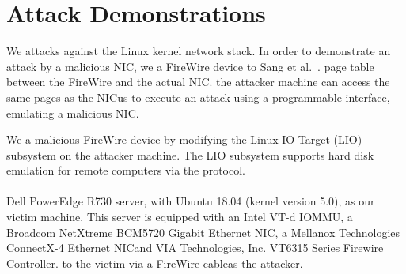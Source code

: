\section{Attack Demonstrations}\label{Sec:setup}


We \DIFdelbegin {}\DIFdelend \DIFaddbegin {}\DIFaddend \compound attacks against the Linux kernel network stack. 
In order to demonstrate an attack by a malicious NIC, we \DIFdelbegin {}\DIFdelend \DIFaddbegin {}\DIFaddend a FireWire device \DIFdelbegin {}\DIFdelend \DIFaddbegin {}\DIFaddend to Sang et al.~\cite{SLND10}. \DIFdelbegin {}\DIFdelend \DIFaddbegin {}\DIFaddend \iova{} page table \DIFdelbegin {}\DIFdelend \DIFaddbegin {}\DIFaddend between the FireWire and the actual NIC. \DIFdelbegin {}\DIFdelend \DIFaddbegin {}\DIFaddend the attacker machine can access the same pages as the NIC\DIFdelbegin {}\DIFdelend \DIFaddbegin {}\DIFaddend us to execute an attack using a programmable interface, emulating a malicious NIC.


We \DIFdelbegin {}\DIFdelend \DIFaddbegin {}\DIFaddend a malicious FireWire device by modifying the Linux-IO Target (LIO) subsystem on the attacker machine. The LIO subsystem supports hard disk emulation for remote computers via the \spb{} protocol. 

\DIFdelbegin \paragraph{}
\addtocounter{paragraph}{-1}%
\DIFdelend \DIFaddbegin \smallskip
\noindent\textbf{}
\DIFaddend Dell PowerEdge R730 server, with Ubuntu 18.04 (kernel version 5.0), as our victim machine. This server is equipped with an Intel VT-d IOMMU, a Broadcom NetXtreme BCM5720 Gigabit Ethernet NIC, a Mellanox Technologies ConnectX-4 Ethernet NIC\DIFaddbegin \DIFadd{, }\DIFaddend and VIA Technologies, Inc. VT6315 Series Firewire Controller. \DIFdelbegin {}\DIFdelend \DIFaddbegin {}\DIFaddend to the victim via a FireWire cable\DIFdelbegin {}\DIFdelend \DIFaddbegin {}\DIFaddend as the attacker. 


